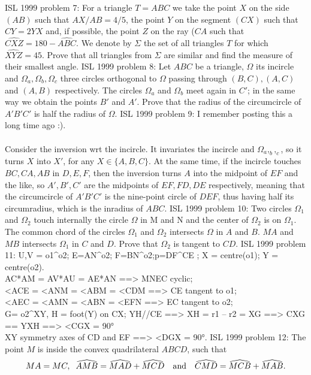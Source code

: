 ISL 1999 problem 7:  For a triangle $T = ABC$ we take the point $X$ on the side $(AB)$ such that $AX/AB=4/5$, the point $Y$ on the segment $(CX)$ such that $CY = 2YX$ and, if possible, the point $Z$ on the ray ($CA$ such that $\widehat{CXZ} = 180 - \widehat{ABC}$. We denote by $\Sigma$ the set of all triangles $T$ for which \\
$\widehat{XYZ} = 45$. Prove that all triangles from $\Sigma$ are similar and find the measure of their smallest angle. 
ISL 1999 problem 8:  Let $ABC$ be a triangle, $\Omega$ its incircle and $\Omega_a, \Omega_b, \Omega_c$ three circles orthogonal to $\Omega$ passing through $(B,C),(A,C)$ and $(A,B)$ respectively. The circles $\Omega_a$ and $\Omega_b$ meet again in $C'$; in the same way we obtain the points $B'$ and $A'$. Prove that the radius of the circumcircle  of $A'B'C'$ is half the radius of $\Omega$. 
ISL 1999 problem 9:  I remember posting this a long time ago :). \\\\
Consider the inversion wrt the incircle. It invariates the incircle and $\Omega_a,_b,_c$, so it turns $X$ into $X'$, for any $X\in\{A,B,C\}$. At the same time, if the incircle touches $BC,CA,AB$ in $D,E,F$, then the inversion turns $A$ into the midpoint of $EF$ and the like, so $A',B',C'$ are the midpoints of $EF,FD,DE$ respectively, meaning that the circumcircle of $A'B'C'$ is the nine-point circle of $D EF$, thus having half its circumradius, which is the inradius of $ABC$. 
ISL 1999 problem 10:  Two circles $\Omega_1$ and $\Omega_2$ touch internally the circle $\Omega$ in M and N and the center of $\Omega_2$ is on $\Omega_1$. The common chord of the circles $\Omega_1$ and $\Omega_2$ intersects $\Omega$ in $A$ and $B$. $MA$ and $MB$ intersects $\Omega_1$ in $C$ and $D$. Prove that $\Omega_2$ is tangent to $CD$. 
ISL 1999 problem 11:  {U,V} = o1^o2; E=AN^o2; F=BN^o2;p=DF^CE ; X = centre(o1); Y = centre(o2). \\
AC*AM = AV*AU = AE*AN ==> MNEC cyclic; \\
<ACE = <ANM = <ABM = <CDM ==> CE tangent to o1; \\
<AEC =  <AMN = <ABN = <EFN ==> EC tangent to o2; \\
G= o2^XY, H = foot(Y) on CX;  YH//CE ==> XH = r1 – r2 = XG ==> CXG == YXH ==> <CGX = 90° \\
XY symmetry axes of CD and EF   ==> <DGX = 90°. 
ISL 1999 problem 12:  The point $M$ is inside the convex quadrilateral $ABCD$, such that
\[
MA = MC, \hspace{0,2cm} \widehat{AMB} = \widehat{MAD} + \widehat{MCD} \quad \textnormal{and} \quad \widehat{CMD} = \widehat{MCB} + \widehat{MAB}.
\]
